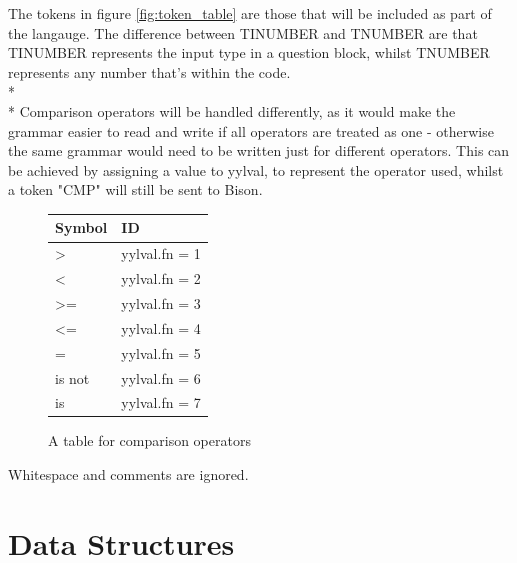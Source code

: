 \documentclass[12pt]{report}
\begin{document}
The tokens in figure \ref{fig:token_table} are those that will be included as part of the langauge.  The difference between TINUMBER and TNUMBER are that TINUMBER represents the input type in a question block, whilst TNUMBER represents any number that's within the code.\\*
\\*
Comparison operators will be handled differently, as it would make the grammar easier to read and write if all operators are treated as one - otherwise the same grammar would need to be written just for different operators.  This can be achieved by assigning a value to yylval, to represent the operator used, whilst a token "CMP" will still be sent to Bison.\\
\begin{figure}[H]
	\begin{center}
		\begin{tabular}{ | l | l | }
		\hline
		\textbf{Symbol} & \textbf{ID} \\ \hline
		\textgreater & yylval.fn = 1 \\ \hline
		\textless & yylval.fn = 2 \\ \hline
		\textgreater = & yylval.fn = 3 \\ \hline
		\textless = & yylval.fn = 4 \\ \hline
		= & yylval.fn = 5 \\ \hline
		is not & yylval.fn = 6 \\ \hline
		is & yylval.fn = 7 \\ \hline
		\end{tabular}
		\caption{A table for comparison operators}\label{fig:cmp_table}
	\end{center}
\end{figure}
Whitespace and comments are ignored.
\section{Data Structures}
\end{document}
